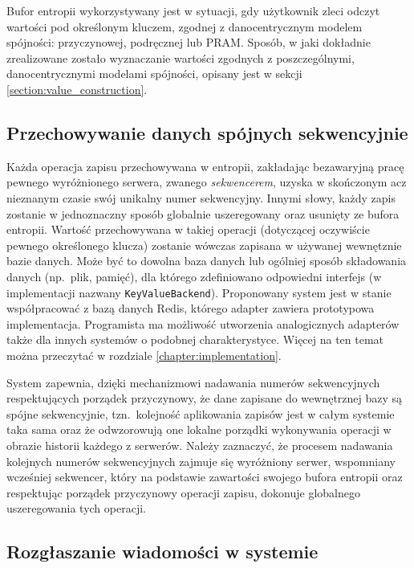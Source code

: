 Bufor entropii wykorzystywany jest w sytuacji, gdy użytkownik zleci odczyt wartości pod określonym kluczem, zgodnej z danocentrycznym modelem spójności: przyczynowej, podręcznej lub PRAM. Sposób, w jaki dokładnie zrealizowane zostało wyznaczanie wartości zgodnych z poszczególnymi, danocentrycznymi modelami spójności, opisany jest w sekcji \ref{section:value_construction}.

\subsection{Przechowywanie danych spójnych sekwencyjnie}

Każda operacja zapisu przechowywana w entropii, zakładając bezawaryjną pracę pewnego wyróżnionego
serwera, zwanego \textit{sekwencerem}, uzyska w skończonym acz nieznanym czasie swój unikalny numer
sekwencyjny. Innymi słowy, każdy zapis zostanie w jednoznaczny sposób globalnie uszeregowany oraz
usunięty ze bufora entropii. Wartość przechowywana w takiej operacji (dotyczącej oczywiście pewnego
określonego klucza) zostanie wówczas zapisana w używanej wewnętznie bazie danych. Może być to
dowolna baza danych lub ogólniej sposób składowania danych (np.\ plik, pamięć), dla którego zdefiniowano odpowiedni interfejs (w implementacji nazwany \texttt{KeyValueBackend}). Proponowany system jest w stanie współpracować z bazą danych Redis, którego adapter zawiera prototypowa implementacja. Programista ma możliwość utworzenia analogicznych adapterów także dla innych systemów o podobnej charakterystyce. Więcej na ten temat można przeczytać w rozdziale \ref{chapter:implementation}.

System zapewnia, dzięki mechanizmowi nadawania numerów sekwencyjnych respektujących porządek
przyczynowy, że dane zapisane do wewnętrznej bazy są spójne sekwencyjnie, tzn.\ kolejność aplikowania zapisów jest w całym systemie taka sama oraz że odwzorowują one lokalne porządki wykonywania operacji w obrazie historii każdego z serwerów. Należy zaznaczyć, że procesem nadawania kolejnych numerów sekwencyjnych zajmuje się wyróżniony serwer, wspomniany wcześniej sekwencer, który na podstawie zawartości swojego bufora entropii oraz respektując porządek przyczynowy operacji zapisu, dokonuje globalnego uszeregowania tych operacji.

\subsection{Rozgłaszanie wiadomości w systemie}

